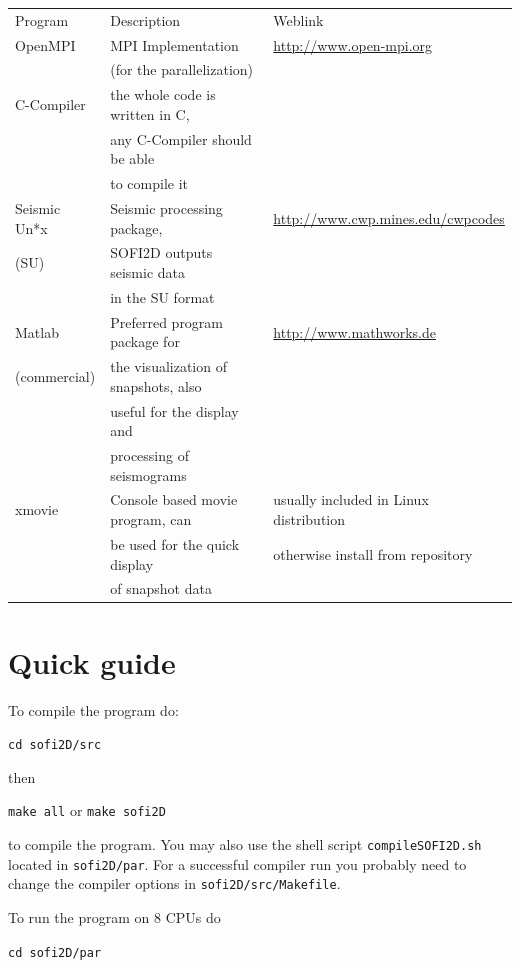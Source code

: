 \documentclass[11pt,onecolumn,oneside]{article}
\begin{document}
\begin{center}
\begin{small}
\begin{tabular}{lll}
Program & Description & Weblink \\ 
OpenMPI & MPI Implementation & \url{http://www.open-mpi.org} \\
& (for the parallelization) & \\
C-Compiler & the whole code is written in C,& \\
& any C-Compiler should be able & \\
& to compile it & \\
Seismic Un*x & Seismic processing package, & \url{http://www.cwp.mines.edu/cwpcodes} \\
(SU)  & SOFI2D outputs seismic data & \\
& in the SU format & \\
Matlab & Preferred program package for & \url{http://www.mathworks.de} \\
(commercial)& the visualization of snapshots, also  & \\
& useful for the display and & \\
& processing of seismograms & \\
xmovie & Console based movie program, can & usually included in Linux distribution\\
& be used for the quick display & otherwise install from repository\\
& of snapshot data  &
\end{tabular}
\end{small}
\end{center}

\section{Quick guide}\label{qguide}
To compile the program do:

\texttt{cd sofi2D/src}

then

\texttt{make all} or \texttt{make sofi2D}

to compile the program. You may also use the shell script \texttt{compileSOFI2D.sh} located in \texttt{sofi2D/par}. For a successful compiler run you probably need to change the compiler options in \texttt{sofi2D/src/Makefile}. 

To run the program on 8 CPUs do

\texttt{cd sofi2D/par}
\end{document}
